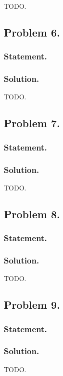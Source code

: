 TODO.

\subsection{Problem 6.}
\subsubsection{Statement.}
\subsubsection{Solution.}

TODO.

\subsection{Problem 7.}
\subsubsection{Statement.}
\subsubsection{Solution.}

TODO.

\subsection{Problem 8.}
\subsubsection{Statement.}
\subsubsection{Solution.}

TODO.

\subsection{Problem 9.}
\subsubsection{Statement.}
\subsubsection{Solution.}

TODO.

\EndArticle
